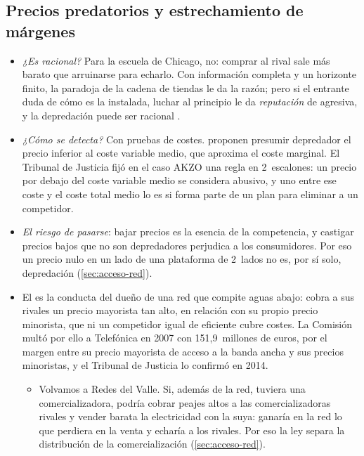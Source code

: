 \documentclass[11pt]{article}
\begin{document}
\subsection{Precios predatorios y estrechamiento de márgenes}\label{anexo:predatorios}

\begin{itemize}
\item \emph{¿Es racional?} Para la escuela de Chicago, no: comprar al rival sale más barato que arruinarse para echarlo\nocite{McGee1958Predatory}. Con información completa y un horizonte finito, la paradoja de la cadena de tiendas le da la razón\nocite{Selten1978Chain}; pero si el entrante duda de cómo es la instalada, luchar al principio le da \emph{reputación} de agresiva, y la depredación puede ser racional\nocite{KrepsWilson1982Reputation,MilgromRoberts1982Predation}  .
\item \emph{¿Cómo se detecta?} Con pruebas de costes. \textcite{AreedaTurner1975Predatory} proponen presumir depredador el precio inferior al coste variable medio, que aproxima el coste marginal. El Tribunal de Justicia fijó en el caso AKZO una regla en 2~escalones: un precio por debajo del coste variable medio se considera abusivo, y uno entre ese coste y el coste total medio lo es si forma parte de un plan para eliminar a un competidor\nocite{TJUE1991AKZO}.
\item \emph{El riesgo de pasarse}: bajar precios es la esencia de la competencia, y castigar precios bajos que no son depredadores perjudica a los consumidores. Por eso un precio nulo en un lado de una plataforma de 2~lados no es, por sí solo, depredación (\ref{sec:acceso-red}).
\item El  es la conducta del dueño de una red que compite aguas abajo: cobra a sus rivales un precio mayorista tan alto, en relación con su propio precio minorista, que ni un competidor igual de eficiente cubre costes. La Comisión multó por ello a Telefónica en 2007 con 151,9~millones de euros, por el margen entre su precio mayorista de acceso a la banda ancha y sus precios minoristas, y el Tribunal de Justicia lo confirmó en 2014\nocite{TJUE2014Telefonica}.
  \begin{itemize}
  \item Volvamos a Redes del Valle. Si, además de la red, tuviera una comercializadora, podría cobrar peajes altos a las comercializadoras rivales y vender barata la electricidad con la suya: ganaría en la red lo que perdiera en la venta y echaría a los rivales. Por eso la ley separa la distribución de la comercialización (\ref{sec:acceso-red}).
  \end{itemize}
\end{itemize}
\end{document}
